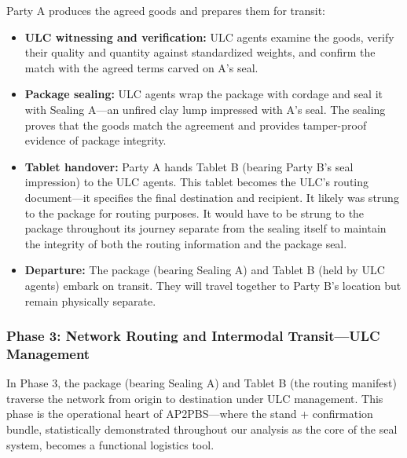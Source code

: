 \documentclass[12pt]{article}
\begin{document}
Party A produces the agreed goods and prepares them for transit:

\begin{itemize}
\item \textbf{ULC witnessing and verification:} ULC agents examine the goods, verify
their quality and quantity against standardized weights, and confirm the match with
the agreed terms carved on A's seal.

\item \textbf{Package sealing:} ULC agents wrap the package with cordage and seal
it with Sealing A—an unfired clay lump impressed with A's seal. The sealing proves
that the goods match the agreement and provides tamper-proof evidence of package
integrity.

\item \textbf{Tablet handover:} Party A hands Tablet B (bearing Party B's seal
impression) to the ULC agents. This tablet becomes the ULC's routing document—it
specifies the final destination and recipient. It likely was strung to the package
for routing purposes. It would have to be strung to the package throughout its journey
separate from the sealing itself to maintain the integrity of both the routing
information and the package seal.

\item \textbf{Departure:} The package (bearing Sealing A) and Tablet B (held by
ULC agents) embark on transit. They will travel together to Party B's location
but remain physically separate.

\end{itemize}

\subsubsection{Phase 3: Network Routing and Intermodal Transit—ULC Management}

In Phase 3, the package (bearing Sealing A) and Tablet B (the routing manifest)
traverse the network from origin to destination under ULC management. This phase
is the operational heart of AP2PBS—where the stand + confirmation bundle,
statistically demonstrated throughout our analysis as the core of the seal
system, becomes a functional logistics tool.
\end{document}
